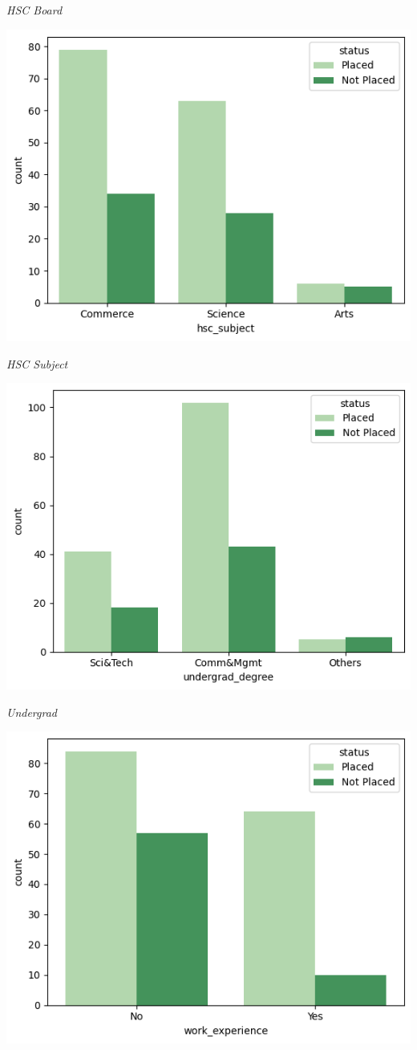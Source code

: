 \documentclass{article}
\begin{document}
\begin{center}
    \textit{HSC Board}
    
    \includegraphics[scale=0.5]{hscsubject.png}

    \textit{HSC Subject}

    \includegraphics[scale=0.5]{undergraddegree.png}

    \textit{Undergrad}
    
    \includegraphics[scale=0.5]{workexperience.png}


\end{center}
\end{document}
